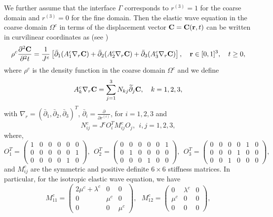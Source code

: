 We further assume that the interface $\Gamma$ corresponds to $r^{(3)} = 1$ for the coarse domain and $r^{(3)} = 0$ for the fine domain. Then the elastic wave equation in the coarse domain $\Omega^c$ in terms of the displacement vector ${\bf C} = {\bf C}({\bf r}, t)$ can be written in curvilinear coordinates as (see \cite{petersson2015wave})
\begin{align}\label{elastic_curvi}
	\rho^c\frac{\partial^2{\bf C}}{\partial^2 t} = \frac{1}{J^c}\left[\bar{\partial}_1(A_1^c\nabla_r{\bf C}) + \bar{\partial}_2(A_2^c\nabla_r{\bf C}) +\bar{\partial}_3(A_3^c\nabla_r{\bf C}) \right],\ \ \  {\bf r}\in[0,1]^3,\ \ \  t\geq0,
\end{align}
where $\rho^c$ is the density function in the coarse domain $\Omega^c$ and we define
\begin{align*} 
A_k^c\nabla_r{\bf C} = \sum_{j = 1}^3 N_{kj}\wt{\partial}_j {\bf C}, \ \ \ k = 1,2,3,
\end{align*}
with $\nabla_r  = (\bar{\partial}_1, \bar{\partial}_2, \bar{\partial}_3)^T$,  $\bar{\partial}_i =\frac{\partial}{\partial r^{(i)}}$, for $i = 1,2,3$ and
\begin{equation}\label{N_definition}
	N_{ij}^c = J^cO_i^TM_{ij}^cO_j, \ \ i,j = 1,2,3,
\end{equation}
where, 
\[ O_{1}^T = \left(\begin{array}{cccccc}
1 & 0 & 0 &0 & 0 & 0\\
0 & 0 & 0 &0 & 0 & 1\\
0 & 0 & 0 &0 & 1 & 0\end{array}\right), \ \  O_{2}^T = \left(\begin{array}{cccccc}
0 & 0 & 0 &0 & 0 & 1\\
0 & 1 & 0 &0 & 0 & 0\\
0 & 0 & 0 &1 & 0 & 0\end{array}\right),  \ \ O_{3}^T = \left(\begin{array}{cccccc}
0 & 0 & 0 &0 & 1 & 0\\
0 & 0 & 0 &1 & 0 & 0\\
0 & 0 & 1 &0 & 0 & 0\end{array}\right),\]
and $M_{ij}^c$ are the symmetric and positive definite $6\times 6$ stiffness matrices. In particular, for the isotropic elastic wave equation, we have
\[ M_{11}^c = \left(\begin{array}{ccc}
2\mu^c+\lambda^c & 0 & 0\\
0 & \mu^c & 0\\
0 & 0 & \mu^c\end{array}\right),\ \ \  M_{12}^c = \left(\begin{array}{ccc}
0 & \lambda^c & 0\\
\mu^c & 0 & 0\\
0 & 0 & 0\end{array}\right), \]
